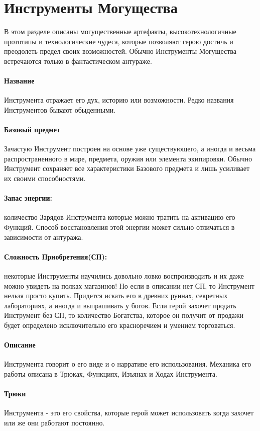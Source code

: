 \section{Инструменты Могущества}
В этом разделе описаны могущественные артефакты, высокотехнологичные прототипы и технологические чудеса, которые позволяют герою достичь и преодолеть предел своих возможностей. Обычно Инструменты Могущества встречаются только в фантастическом антураже.

\paragraph{Название} Инструмента отражает его дух, историю или возможности. Редко названия Инструментов бывают обыденными.
\paragraph{Базовый предмет} Зачастую Инструмент построен на основе уже существующего, а иногда и весьма распространенного в мире, предмета, оружия или элемента экипировки. Обычно Инструмент сохраняет все характеристики Базового предмета и лишь усиливает их своими способностями.
\paragraph{Запас энергии: } количество Зарядов Инструмента которые можно тратить на активацию его Функций. Способ восстановления этой энергии может сильно отличаться в зависимости от антуража.
\paragraph{Сложность Приобретения(СП): }некоторые Инструменты научились довольно ловко воспроизводить и их даже можно увидеть на полках магазинов! Но если в описании нет СП, то Инструмент нельзя просто купить. Придется искать его в древних руинах, секретных лабораториях, а иногда и выпрашивать у богов. Если герой захочет продать Инструмент без СП, то количество Богатства, которое он получит от продажи будет определено исключительно его красноречием и умением торговаться.
\paragraph{Описание }Инструмента говорит о его виде и о нарративе его использования. Механика его работы описана в Трюках, Функциях, Изъянах и Ходах Инструмента.
\paragraph{Трюки }Инструмента - это его свойства, которые герой может использовать когда захочет или же они работают постоянно.
